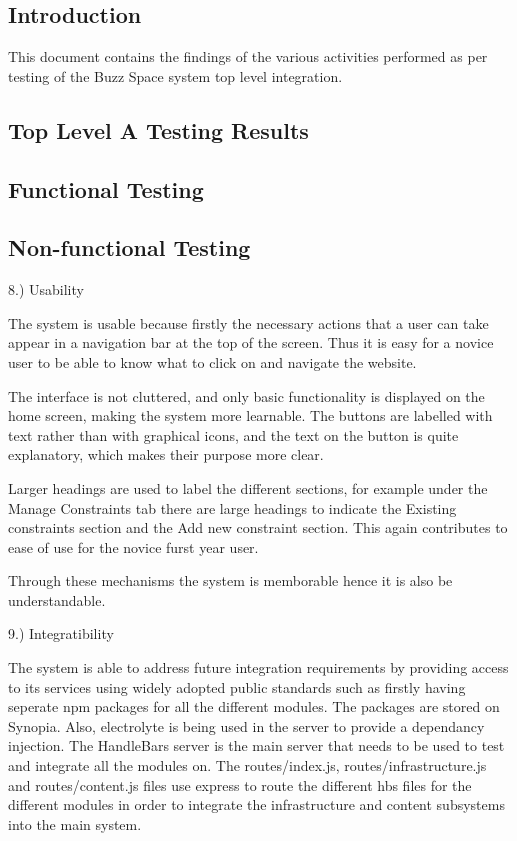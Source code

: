 \documentclass[hidelinks, 12pt, oneside]{article}
\begin{document}
\tableofcontents

\newpage

\subsection{Introduction}
This document contains the findings of the various activities performed as per testing of the Buzz Space system top level integration.

\subsection{Top Level A Testing Results}

\subsection{Functional Testing}

\subsection{Non-functional Testing} 

8.) Usability

The system is usable because firstly the necessary actions that a user can take appear in a navigation bar at the top of the screen. Thus it is easy for a novice user to be able to know what to click on and navigate the website. 

The interface is not cluttered, and only basic functionality is displayed on the home screen, making the system more learnable. The buttons are labelled with text rather than with graphical icons, and the text on the button is quite explanatory, which makes their purpose more clear. 

Larger headings are used to label the different sections, for example under the Manage Constraints tab there are large headings to indicate the Existing constraints section and the Add new constraint section. This again contributes to ease of use for the novice furst year user.

Through these mechanisms the system is memborable hence it is also be understandable.  

9.) Integratibility

The system is able to address future integration requirements by providing access to its services using widely adopted public standards such as firstly having seperate npm packages for all the different modules. The packages are stored on Synopia. Also, electrolyte is being used in the server to provide a dependancy injection. The HandleBars server is the main server that needs to be used to test and integrate all the modules on. The routes/index.js, routes/infrastructure.js and routes/content.js files use express to route the different hbs files for the different modules in order to integrate the infrastructure and content subsystems into the main system. 
\end{document}
